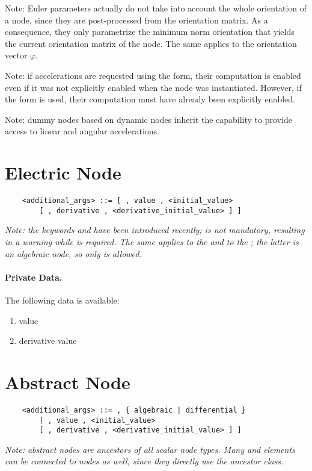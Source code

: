 Note: Euler parameters actually do not take into account 
the whole orientation of a node, since they are post-processed
from the orientation matrix.
As a consequence, they only parametrize the minimum norm orientation
that yields the current orientation matrix of the node.
The same applies to the orientation vector $\varphi$.

Note: if accelerations are requested using the  form,
their computation is enabled even if it was not explicitly enabled
when the node was instantiated.
However, if the  form is used, their computation must have
already been explicitly enabled.

Note: dummy nodes based on dynamic nodes inherit the capability to provide
access to linear and angular accelerations.


\section{Electric Node}
\begin{verbatim}
    <additional_args> ::= [ , value , <initial_value>
        [ , derivative , <derivative_initial_value> ] ]
\end{verbatim}
\emph{Note: the keywords  and 
have been introduced recently;  is not mandatory,
resulting in a warning while  is required.
The same applies to the  
and to the ; the latter is an algebraic
node, so only  is allowed.
}

\paragraph{Private Data.}
\label{sec:NODE:ELECTRIC:PRIV}
The following data is available:
\begin{enumerate}
\item {} value
\item {} derivative value
\end{enumerate}





\section{Abstract Node}
\begin{verbatim}
    <additional_args> ::= , { algebraic | differential }
        [ , value , <initial_value>
        [ , derivative , <derivative_initial_value> ] ]
\end{verbatim}
\emph{
	Note: abstract nodes are ancestors of all scalar node types.
	Many  and  elements can be connected
	to  nodes as well, since they directly use
	the ancestor class. 
}

